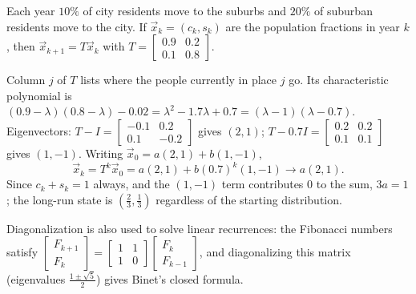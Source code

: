 \begin{example}
Each year $10\%$ of city residents move to the suburbs and $20\%$ of suburban residents move to the city.
If $\vec x_k=(c_k,s_k)$ are the population fractions in year $k$, then $\vec x_{k+1}=T\vec x_k$ with
$T=\begin{bmatrix}0.9&0.2\\0.1&0.8\end{bmatrix}$.
\begin{center}
\end{center}
Column $j$ of $T$ lists where the people currently in place $j$ go. Its characteristic polynomial is
$(0.9-\lambda)(0.8-\lambda)-0.02=\lambda^2-1.7\lambda+0.7=(\lambda-1)(\lambda-0.7)$.
Eigenvectors: $T-I=\begin{bmatrix}-0.1&0.2\\0.1&-0.2\end{bmatrix}$ gives $(2,1)$; $T-0.7I=\begin{bmatrix}0.2&0.2\\0.1&0.1\end{bmatrix}$
gives $(1,-1)$. Writing $\vec x_0=a(2,1)+b(1,-1)$,
\[
  \vec x_k=T^k\vec x_0=a(2,1)+b(0.7)^k(1,-1)\longrightarrow a(2,1).
\]
Since $c_k+s_k=1$ always, and the $(1,-1)$ term contributes $0$ to the sum, $3a=1$; the long-run state is
$\left(\frac23,\frac13\right)$ regardless of the starting distribution.
\end{example}

\begin{aside}
Diagonalization is also used to solve linear recurrences: the Fibonacci numbers satisfy
$\begin{bmatrix}F_{k+1}\\F_k\end{bmatrix}=\begin{bmatrix}1&1\\1&0\end{bmatrix}\begin{bmatrix}F_k\\F_{k-1}\end{bmatrix}$, and diagonalizing
this matrix (eigenvalues $\frac{1\pm\sqrt5}{2}$) gives Binet's closed formula.
\end{aside}

